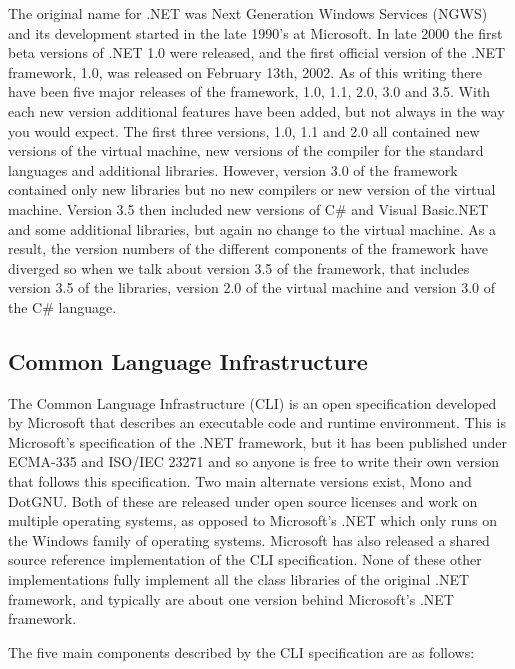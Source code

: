	The original name for .NET was Next Generation Windows Services (NGWS) and 
	its development started in the late 1990's at Microsoft. In late 2000 the 
	first beta versions of .NET 1.0 were released, and the first official 
	version of the .NET framework, 1.0, was released on February 13th, 2002. As 
	of this writing there have been five major releases of the framework, 1.0, 
	1.1, 2.0, 3.0 and 3.5. With each new version additional features have been 
	added, but not always in the way you would expect. The first three versions, 
	1.0, 1.1 and 2.0 all contained new versions of the virtual machine, new 
	versions of the compiler for the standard languages and additional 
	libraries. However, version 3.0 of the framework contained only new 
	libraries but no new compilers or new version of the virtual machine. 
	Version 3.5 then included new versions of C\# and Visual Basic.NET and some 
	additional libraries, but again no change to the virtual machine. As a 
	result, the version numbers of the different components of the framework 
	have diverged so when we talk about version 3.5 of the framework, that 
	includes version 3.5 of the libraries, version 2.0 of the virtual machine 
	and version 3.0 of the C\# language. 

\subsection{Common Language Infrastructure}

	The Common Language Infrastructure (CLI) is an open specification developed 
	by Microsoft that describes an executable code and runtime environment. This 
	is Microsoft's specification of the .NET framework, but it has been 
	published under ECMA-335 and ISO/IEC 23271 and so anyone is free to write 
	their own version that follows this specification. Two main alternate 
	versions exist, Mono and DotGNU. Both of these are released under open 
	source licenses and work on multiple operating systems, as opposed to 
	Microsoft's .NET which only runs on the Windows family of operating systems. 
	Microsoft has also released a shared source reference implementation of the 
	CLI specification. None of these other implementations fully implement all 
	the class libraries of the original .NET framework, and typically are about 
	one version behind Microsoft's .NET framework.

	The five main components described by the CLI specification are as follows:

